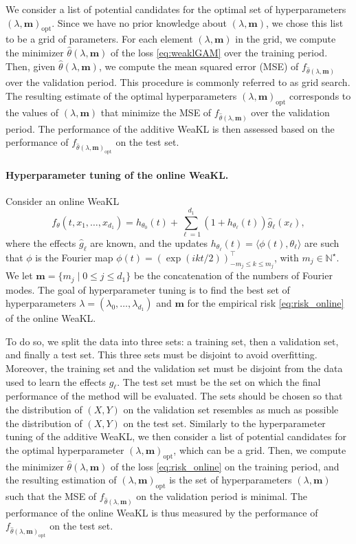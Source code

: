 We consider a list of potential candidates for the optimal set of hyperparameters $(\lambda ,\mathbf{m})_{\mathrm{opt}}$. 
Since we have no prior knowledge about $(\lambda, \mathbf{m})$, we chose this list to be a grid of parameters. For each element $(\lambda, \mathbf{m})$ in the grid, we compute the minimizer $\hat \theta(\lambda, \mathbf{m})$ of the loss \eqref{eq:weaklGAM} over the training period. Then, given $\hat \theta(\lambda, \mathbf{m})$, we compute the mean squared error (MSE) of $f_{\hat \theta(\lambda, \mathbf{m})}$ over the validation period. This procedure is commonly referred to as grid search. The resulting estimate of the optimal hyperparameters $(\lambda, \mathbf{m})_{\mathrm{opt}}$ corresponds to the values of  $(\lambda, \mathbf{m})$ that minimize the MSE of  $f_{\hat \theta(\lambda, \mathbf{m})}$ over the validation period. The performance of the additive WeaKL is then assessed based on the performance of $f_{\hat \theta(\lambda, \mathbf{m})_{\mathrm{opt}}}$ on the test set.
\paragraph{Hyperparameter tuning of the online WeaKL.} Consider an online WeaKL
\begin{equation*}
    f_\theta(t, x_1, \hdots, x_{d_1}) = h_{\theta_0}(t)+ \sum_{\ell=1}^{d_1} (1+ h_{\theta_\ell}(t))  \hat g_\ell(x_\ell),
\end{equation*}
where the effects $\hat g_\ell$ are known, and the updates $h_{\theta_\ell}(t) = \langle \phi(t), \theta_\ell\rangle$ are such that $\phi$ is the Fourier map $\phi(t) =(\exp(i k t/2))_{-m_j\leq k \leq m_j}^\top$, with $m_j \in \mathbb N^\star$.
We let $\mathbf{m} = \{m_j\mid 0\leq j \leq d_1\}$ be the concatenation of the numbers of Fourier modes.
The goal of hyperparameter tuning is to find the best set of hyperparameters $\lambda = (\lambda_0, \hdots, \lambda_{d_1})$ and 
$\mathbf{m}$ for the empirical risk \eqref{eq:risk_online} of the online WeaKL.

To do so, we split the data into three sets: a training set, then a validation set, and finally a test set.
This three sets must be disjoint to avoid overfitting.
Moreover, the training set and the validation set must be disjoint from the data used to learn the effects $\hat g_\ell$.
The test set must be the set on which the final performance of the method will be evaluated. 
The sets should be chosen so that the distribution of $(X,Y)$ on the validation set resembles as much as possible the distribution of $(X,Y)$ on the test set.
Similarly to the hyperparameter tuning of the additive WeaKL, we then consider a list of potential candidates for the optimal hyperparameter $(\lambda ,\mathbf{m})_{\mathrm{opt}}$, which can be a grid.
Then, we compute the minimizer $\hat \theta(\lambda, \mathbf{m})$ of the loss \eqref{eq:risk_online} on the training period, and the resulting estimation of $(\lambda, \mathbf{m})_{\mathrm{opt}}$ is the set of hyperparameters $(\lambda, \mathbf{m})$ such that the MSE of $f_{\hat \theta(\lambda, \mathbf{m})}$ on the validation period is minimal.
The performance of the online WeaKL is thus measured by the performance of $f_{\hat \theta(\lambda, \mathbf{m})_{\mathrm{opt}}}$ on the test set.

